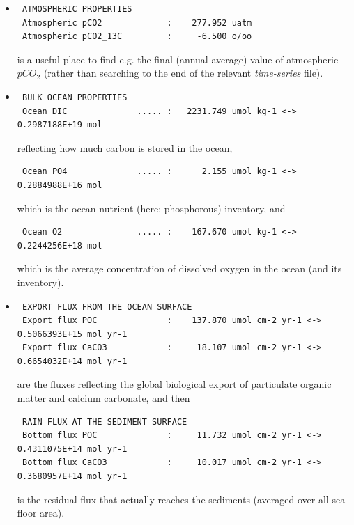 \begin{itemize}[noitemsep]
\vspace{1mm}
\begin{itemize}[noitemsep]
\item
\vspace{1mm}
\vspace{-0mm}\footnotesize\begin{verbatim}
 ATMOSPHERIC PROPERTIES
 Atmospheric pCO2             :    277.952 uatm
 Atmospheric pCO2_13C         :     -6.500 o/oo
\end{verbatim}\normalsize\vspace{1mm}
is a useful place to find e.g. the final (annual average) value of atmospheric \(pCO_{2}\) (rather than searching to the end of the relevant \textit{time-series} file).
\item
\vspace{1mm}
\vspace{-0mm}\footnotesize\begin{verbatim}
 BULK OCEAN PROPERTIES
 Ocean DIC              ..... :   2231.749 umol kg-1 <->   0.2987188E+19 mol
\end{verbatim}\normalsize\vspace{1mm}
reflecting how much carbon is stored in the ocean, 
\vspace{0mm}\footnotesize\begin{verbatim}
 Ocean PO4              ..... :      2.155 umol kg-1 <->   0.2884988E+16 mol
\end{verbatim}\normalsize\vspace{0mm}
which is the ocean nutrient (here: phosphorous) inventory, and
\vspace{-0mm}\footnotesize\begin{verbatim}
 Ocean O2               ..... :    167.670 umol kg-1 <->   0.2244256E+18 mol
\end{verbatim}\normalsize\vspace{0mm}
which is the average concentration of dissolved oxygen in the ocean (and its inventory).
\item
\vspace{1mm}
\vspace{-0mm}\footnotesize\begin{verbatim}
 EXPORT FLUX FROM THE OCEAN SURFACE
 Export flux POC              :    137.870 umol cm-2 yr-1 <->   0.5066393E+15 mol yr-1
 Export flux CaCO3            :     18.107 umol cm-2 yr-1 <->   0.6654032E+14 mol yr-1
\end{verbatim}\normalsize\vspace{1mm}
are the fluxes reflecting the global biological export of particulate organic matter and calcium carbonate, and then
\vspace{-0mm}\footnotesize\begin{verbatim}
 RAIN FLUX AT THE SEDIMENT SURFACE
 Bottom flux POC              :     11.732 umol cm-2 yr-1 <->   0.4311075E+14 mol yr-1
 Bottom flux CaCO3            :     10.017 umol cm-2 yr-1 <->   0.3680957E+14 mol yr-1
\end{verbatim}\normalsize\vspace{0mm}
is the residual flux that actually reaches the sediments (averaged over all sea-floor area).
\end{itemize}


\end{itemize}
